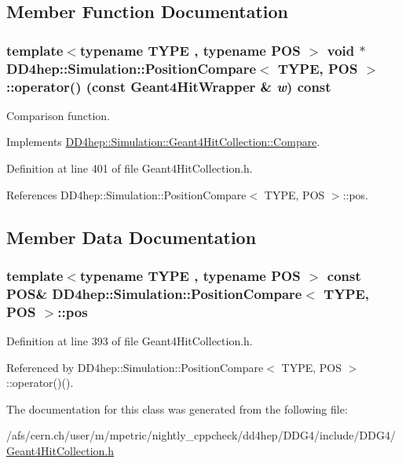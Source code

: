 \subsection{Member Function Documentation}
\hypertarget{class_d_d4hep_1_1_simulation_1_1_position_compare_a73ccac6277f2059df586125061ccce41}{
\subsubsection[{operator()}]{\setlength{\rightskip}{0pt plus 5cm}template$<$typename TYPE , typename POS $>$ void $\ast$ {\bf DD4hep::Simulation::PositionCompare}$<$ TYPE, POS $>$::operator() (const {\bf Geant4HitWrapper} \& {\em w}) const}}
\label{class_d_d4hep_1_1_simulation_1_1_position_compare_a73ccac6277f2059df586125061ccce41}


Comparison function. 

Implements \hyperlink{class_d_d4hep_1_1_simulation_1_1_geant4_hit_collection_1_1_compare_ad81521e6dfc48aaee6d2dd9464a7afeb}{DD4hep::Simulation::Geant4HitCollection::Compare}.

Definition at line 401 of file Geant4HitCollection.h.

References DD4hep::Simulation::PositionCompare$<$ TYPE, POS $>$::pos.

\subsection{Member Data Documentation}
\hypertarget{class_d_d4hep_1_1_simulation_1_1_position_compare_a2a70dd5d725fc539d889a033a51ad038}{
\subsubsection[{pos}]{\setlength{\rightskip}{0pt plus 5cm}template$<$typename TYPE , typename POS $>$ const POS\& {\bf DD4hep::Simulation::PositionCompare}$<$ TYPE, POS $>$::{\bf pos}}}
\label{class_d_d4hep_1_1_simulation_1_1_position_compare_a2a70dd5d725fc539d889a033a51ad038}


Definition at line 393 of file Geant4HitCollection.h.

Referenced by DD4hep::Simulation::PositionCompare$<$ TYPE, POS $>$::operator()().

The documentation for this class was generated from the following file:\begin{DoxyCompactItemize}
\item 
/afs/cern.ch/user/m/mpetric/nightly\_\-cppcheck/dd4hep/DDG4/include/DDG4/\hyperlink{_geant4_hit_collection_8h}{Geant4HitCollection.h}\end{DoxyCompactItemize}
